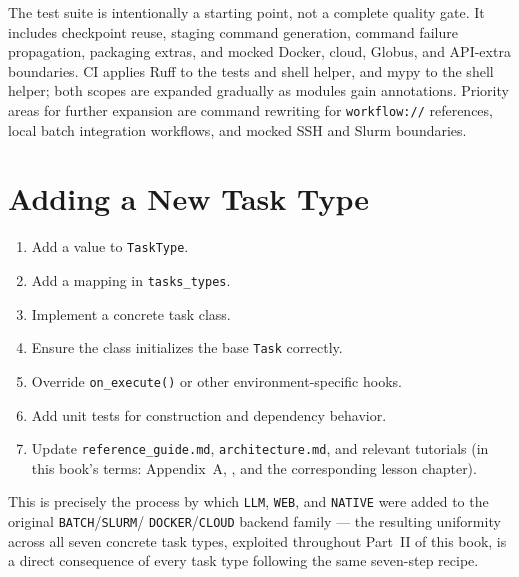 \begin{practicebox}
The test suite is intentionally a starting point, not a complete quality
gate. It includes checkpoint reuse, staging command generation, command
failure propagation, packaging extras, and mocked Docker, cloud, Globus, and
API-extra boundaries. CI applies Ruff to the tests and shell helper, and
mypy to the shell helper; both scopes are expanded gradually as modules gain
annotations. Priority areas for further expansion are command rewriting for
\texttt{workflow://} references, local batch integration workflows, and
mocked SSH and Slurm boundaries.
\end{practicebox}

\section{Adding a New Task Type}

\begin{enumerate}[leftmargin=1.6em]
  \item Add a value to \texttt{TaskType}.
  \item Add a mapping in \texttt{tasks\_types}.
  \item Implement a concrete task class.
  \item Ensure the class initializes the base \texttt{Task} correctly.
  \item Override \texttt{on\_execute()} or other environment-specific
    hooks.
  \item Add unit tests for construction and dependency behavior.
  \item Update \texttt{reference\_guide.md}, \texttt{architecture.md}, and
    relevant tutorials (in this book's terms: Appendix~A,
    , and the corresponding lesson chapter).
\end{enumerate}

This is precisely the process by which \texttt{LLM}, \texttt{WEB}, and
\texttt{NATIVE} were added to the original \texttt{BATCH}/\texttt{SLURM}/
\texttt{DOCKER}/\texttt{CLOUD} backend family --- the resulting uniformity
across all seven concrete task types, exploited throughout Part~II of this
book, is a direct consequence of every task type following the same
seven-step recipe.

